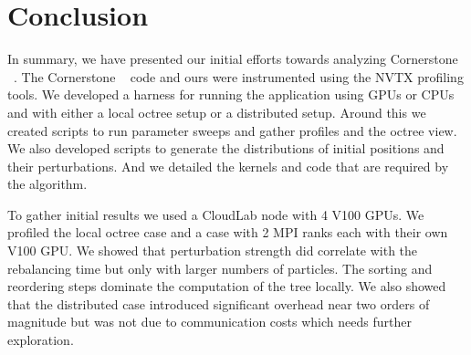 \section{Conclusion}
\label{sec:conclusion}

In summary, we have presented our initial efforts towards analyzing Cornerstone ~\cite{cornerstone}. The Cornerstone ~\cite{cornerstone} code and ours were instrumented using the NVTX profiling tools. We developed a harness for running the application using GPUs or CPUs and with either a local octree setup or a distributed setup. Around this we created scripts to run parameter sweeps and gather profiles and the octree view. We also developed scripts to generate the distributions of initial positions and their perturbations. And we detailed the kernels and code that are required by the algorithm.

To gather initial results we used a CloudLab node with 4 V100 GPUs. We profiled the local octree case and a case with 2 MPI ranks each with their own V100 GPU. We showed that perturbation strength did correlate with the rebalancing time but only with larger numbers of particles. The sorting and reordering steps dominate the computation of the tree locally. We also showed that the distributed case introduced significant overhead near two orders of magnitude but was not due to communication costs which needs further exploration.
